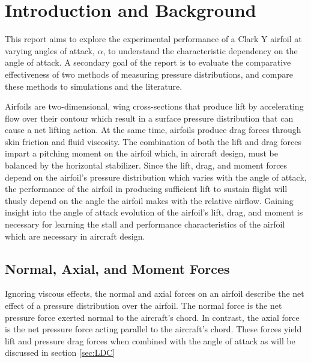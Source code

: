 \documentclass[runningheads]{llncs}
\begin{document}


\section{Introduction and Background}\label{sec:introduction_and_background}

\noindent
This report aims to explore the experimental performance of a Clark Y airfoil at varying angles of attack, $\alpha$, to understand the characteristic dependency on the angle of attack. A secondary goal of the report is to evaluate the comparative effectiveness of two methods of measuring pressure distributions, and compare these methods to simulations and the literature.\newline

\noindent
Airfoils are two-dimensional, wing cross-sections that produce lift by accelerating flow over their contour which result in a surface pressure distribution that can cause a net lifting action. At the same time, airfoils produce drag forces through skin friction and fluid viscosity. The combination of both the lift and drag forces impart a pitching moment on the airfoil which, in aircraft design, must be balanced by the horizontal stabilizer. Since the lift, drag, and moment forces depend on the airfoil's pressure distribution which varies with the angle of attack, the performance of the airfoil in producing sufficient lift to sustain flight will thusly depend on the angle the airfoil makes with the relative airflow. Gaining insight into the angle of attack evolution of the airfoil's lift, drag, and moment is necessary for learning the stall and performance characteristics of the airfoil which are necessary in aircraft design.\newline

\subsection{Normal, Axial, and Moment Forces}

\noindent
Ignoring viscous effects, the normal and axial forces on an airfoil describe the net effect of a pressure distribution over the airfoil. The normal force is the net pressure force exerted normal to the aircraft's chord. In contrast, the axial force is the net pressure force acting parallel to the aircraft's chord. These forces yield lift and pressure drag forces when combined with the angle of attack as will be discussed in section \ref{sec:LDC}\newline
\end{document}
